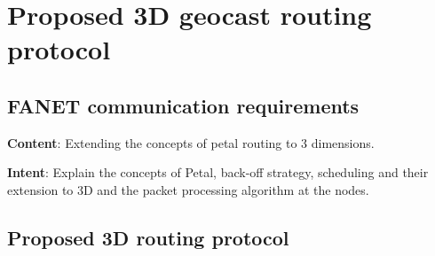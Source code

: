 \chapter{Proposed 3D geocast routing protocol}

\section{FANET communication requirements}
\textbf{Content}: Extending the concepts of petal routing to 3 dimensions.

\textbf{Intent}: Explain the concepts of Petal, back-off strategy, scheduling and their extension to 3D and the packet processing algorithm at the nodes. 

\section{Proposed 3D routing protocol}